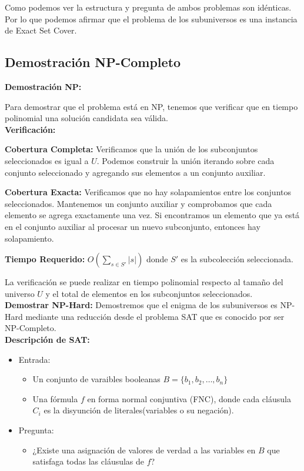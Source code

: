 \documentclass{article}
\begin{document}
Como podemos ver la estructura y pregunta de ambos problemas son idénticas.
Por lo que podemos afirmar que el problema de los subuniversos es una instancia de Exact Set Cover.


\subsection{Demostración NP-Completo}

\textbf{Demostración NP:}

Para demostrar que el problema está en NP, tenemos que verificar que en tiempo polinomial una solución candidata sea válida. \\

\textbf{Verificación:}

\textbf{Cobertura Completa:} Verificamos que la unión de los subconjuntos seleccionados es igual a \(U\). Podemos construir la unión iterando sobre cada conjunto seleccionado y agregando sus elementos a un conjunto auxiliar.

\textbf{Cobertura Exacta:} Verificamos que no hay solapamientos entre los conjuntos seleccionados. Mantenemos un conjunto auxiliar y comprobamos que cada elemento se agrega exactamente una vez. Si encontramos un elemento que ya está en el conjunto auxiliar al procesar un nuevo subconjunto, entonces hay solapamiento.

\textbf{Tiempo Requerido:} $O(\sum_{s\in S'} |s|)$ donde \(S'\) es la subcolección seleccionada.

La verificación se puede realizar en tiempo polinomial respecto al tamaño del universo \(U\) y el total de elementos en los subconjuntos seleccionados.
\\

\textbf{Demostrar NP-Hard:}
 Demostremos que el enigma de los subuniversos es NP-Hard mediante una reducción desde el problema SAT que es conocido por ser NP-Completo.
 \\

\textbf{Descripción de SAT:}
\begin{itemize}
\item Entrada:
    \begin{itemize}
    \item Un conjunto de varaibles booleanas \(B = \)$\{b_1,b_2, \dots, b_n\}$
    \item Una fórmula \(f\) en forma normal conjuntiva (FNC), donde cada cláusula $C_i$ es la disyunción de literales(variables o su negación).
    \end{itemize}
\item Pregunta:
    \begin{itemize}
    \item ¿Existe una asignación de valores de verdad a las variables en \(B\) que satisfaga todas las cláusulas de \(f\)?\\
    \end{itemize}
\end{itemize}
\end{document}
